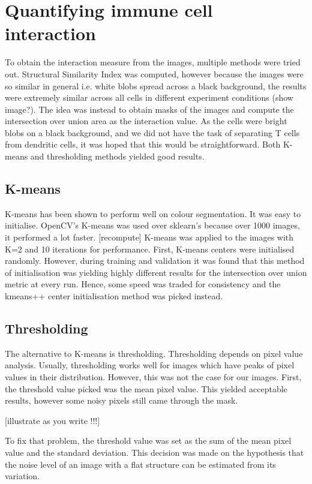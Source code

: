 \documentclass{l4proj}
\begin{document}
\section{Quantifying immune cell interaction}

To obtain the interaction measure from the images, multiple methods were tried out. Structural Similarity Index was computed, however because the images were so similar in general i.e. white blobs spread across a black background, the results were extremely similar across all cells in different experiment conditions (show image?). The idea was instead to obtain masks of the images and compute the intersection over union area as the interaction value. As the cells were bright blobs on a black background, and we did not have the task of separating T cells from dendritic cells, it was hoped that this would be straightforward. Both K-means and thresholding methods yielded good results.

\subsection{K-means}
K-means has been shown to perform well on colour segmentation. It was easy to initialise. OpenCV's K-means was used over sklearn's because over 1000 images, it performed a lot faster. [recompute] K-means was applied to the images with K=2 and 10 iterations for performance. First, K-means centers were initialised randomly. However, during training and validation it was found that this method of initialisation was yielding highly different results for the intersection over union metric at every run. Hence, some speed was traded for consistency and the kmeans++ center initialisation method was picked instead.

\subsection{Thresholding}
The alternative to K-means is thresholding. Thresholding depends on pixel value analysis. Usually, thresholding works well for images which have peaks of pixel values in their distribution. However, this was not the case for our images. First, the threshold value picked was the mean pixel value. This yielded acceptable results, however some noisy pixels still came through the mask.

[illustrate as you write !!!]

To fix that problem, the threshold value was set as the sum of the mean pixel value and the standard deviation. This decision was made on the hypothesis that the noise level of an image with a flat structure can be estimated from its variation.
\end{document}
